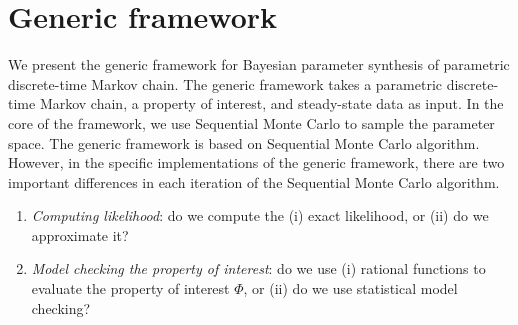 \section{Generic framework}
We present the generic framework for Bayesian parameter synthesis of parametric discrete-time Markov
chain. The generic framework takes a parametric discrete-time Markov chain, a property of interest,
and steady-state data as input. In the core of the framework, we use Sequential Monte Carlo to
sample the parameter space. The generic framework is based on Sequential Monte Carlo algorithm.
However, in the specific implementations of the generic framework, there are two important
differences in each iteration of the Sequential Monte Carlo algorithm.
\begin{enumerate}
    \item \textit{Computing likelihood}: do we compute the (i) exact likelihood, or (ii) do we approximate it?
    \item \textit{Model checking the property of interest}: do we use (i) rational functions to
          evaluate the property of interest $\Phi$, or (ii) do we use statistical model checking?
\end{enumerate}

